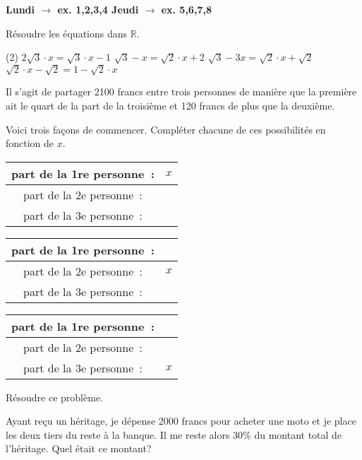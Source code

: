 \documentclass[a4paper,12pt]{report}
\begin{document}
{\bfseries Lundi $\longrightarrow$ ex. 1,2,3,4  \hfill Jeudi $\longrightarrow$ ex. 5,6,7,8}


\begin{exo}[2]
Résoudre les équations dans $\mathbb{R}$.
\begin{tasks}(2)
\task $2 \sqrt{3} \cdot x=\sqrt{3} \cdot x-1$
\task $\sqrt{3}-x=\sqrt{2} \cdot x+2$
\task $\sqrt{3}-3 x=\sqrt{2} \cdot x+\sqrt{2}$
\task $\sqrt{2} \cdot x-\sqrt{2}=1-\sqrt{2} \cdot x$
\end{tasks}
\end{exo}

\begin{exo}[1]
	Il s'agit de partager 2100 francs entre trois personnes de manière que la première ait le quart de la part de la troisième et 120 francs de plus que la deuxième.
	\begin{tasks}
		\task Voici trois façons de commencer. Compléter chacune de ces possibilités en fonction de $x$.

\begin{tabular}{|c|c|}
\hline part de la 1re personne~: & $x$ \\
\hline part de la 2e personne~: & \\ 
\hline part de la 3e personne~: &\\ 
\hline
\end{tabular}
\begin{tabular}{|c|c|}
\hline part de la 1re personne~: & \\
\hline part de la 2e personne~: & $x$ \\ 
\hline part de la 3e personne~: &\\ 
\hline
\end{tabular}
\begin{tabular}{|c|c|}
\hline part de la 1re personne~: &  \\
\hline part de la 2e personne~: & \\ 
\hline part de la 3e personne~: &$x$\\ 
\hline
\end{tabular}
\task Résoudre ce problème.
	\end{tasks}
\end{exo}

\begin{exo}[2]
Ayant reçu un héritage, je dépense 2000 francs pour acheter une moto et je place les deux tiers du reste à la banque. Il me reste alors $30 \%$ du montant total de l'héritage. Quel était ce montant?
\end{exo}
\end{document}
